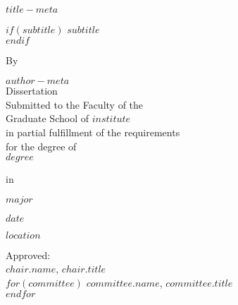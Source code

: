 \thispagestyle{empty}
\begin{center}
\doublespacing
$title-meta$

$if(subtitle)$
$subtitle$\\
$endif$

By

$author-meta$\\[2em]

Dissertation\\
Submitted to the Faculty of the\\
Graduate School of $institute$\\
in partial fulfillment of the requirements\\
for the degree of\\

\uppercase{$degree$}

in

$major$

$date$

$location$\\
\end{center}

\vfill
\begin{center}
Approved:\\[3em]
$chair.name$, $chair.title$ \\[1.5em]
$for(committee)$
 $committee.name$, $committee.title$\\[1.5em]
$endfor$
\end{center}
\vfill
